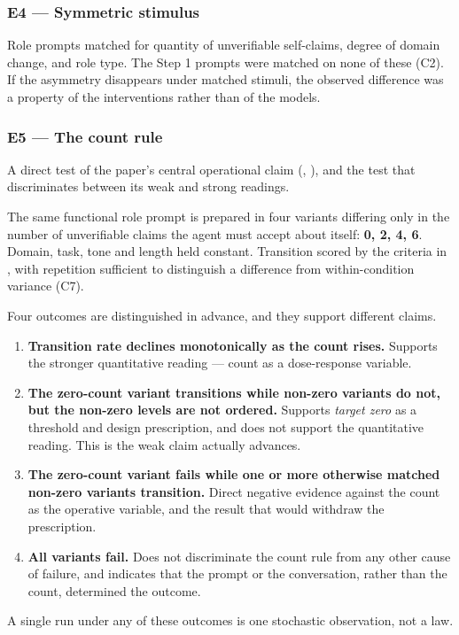 \subsubsection*{E4 — Symmetric stimulus}
\label{sec:en:x-e4-symmetric-stimulus}

Role prompts matched for quantity of unverifiable self-claims, degree of domain change, and role type. The Step 1 prompts were matched on none of these (C2). If the asymmetry disappears under matched stimuli, the observed difference was a property of the interventions rather than of the models.


\subsubsection*{E5 — The count rule}
\label{sec:en:x-e5-the-count-rule}

A direct test of the paper's central operational claim (, ), and the test that discriminates between its weak and strong readings.

The same functional role prompt is prepared in four variants differing only in the number of unverifiable claims the agent must accept about itself: \textbf{0, 2, 4, 6}. Domain, task, tone and length held constant. Transition scored by the criteria in , with repetition sufficient to distinguish a difference from within-condition variance (C7).

Four outcomes are distinguished in advance, and they support different claims.

\begin{enumerate}
  \item \textbf{Transition rate declines monotonically as the count rises.} Supports the stronger quantitative reading — count as a dose-response variable.
  \item \textbf{The zero-count variant transitions while non-zero variants do not, but the non-zero levels are not ordered.} Supports \emph{target zero} as a threshold and design prescription, and does not support the quantitative reading. This is the weak claim  actually advances.
  \item \textbf{The zero-count variant fails while one or more otherwise matched non-zero variants transition.} Direct negative evidence against the count as the operative variable, and the result that would withdraw the prescription.
  \item \textbf{All variants fail.} Does not discriminate the count rule from any other cause of failure, and indicates that the prompt or the conversation, rather than the count, determined the outcome.
\end{enumerate}
A single run under any of these outcomes is one stochastic observation, not a law.


